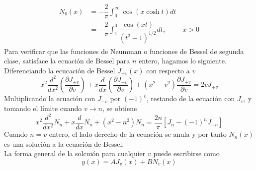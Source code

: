 \begin{eqnarray}
\begin{aligned}
N_{0}(x) &= - \dfrac{2}{\pi} \int_{0}^{\infty} \cos (x \cosh t ) dt \\
&= - \dfrac{2}{\pi} \int_{1}^{0} \dfrac{\cos (xt)}{(t^{2}-1)^{1/2}} dt, \hspace{1cm}  x>0
\end{aligned}
\label{eq:ecuacion_11_65a}
\end{eqnarray}
Para verificar que las funciones de Neumman o funciones de Bessel de segunda clase, satisface la ecuación de Bessel para $n$ entero, hagamos lo siguiente. Diferenciando la ecucación de Bessel $J_{\pm v}(x)$ con respecto a $v$
\begin{equation}
x^{2} \dfrac{d^{2}}{dx^{2}} \left( \dfrac{\partial J_{\pm v}}{\partial v} \right) + x \dfrac{d}{dx} \left( \dfrac{\partial J_{\pm v}}{\partial v} \right) + (x^{2} - v^{2}) \dfrac{\partial J_{\pm v}}{\partial v} = 2 v J_{\pm v}
\label{eq:ecuacion_11_66}
\end{equation}
Multiplicando la ecuación con $J_{-v}$ por $(-1)^{v}$, restando de la ecuación con $J_{v}$, y tomando el límite cuando $v \to n$, se obtiene
\begin{equation}
x^{2} \dfrac{d^{2}}{dx^{2}} N_{n} +  x \dfrac{d}{dx} N_{n} + (x^{2} - n^{2}) N_{n} = \dfrac{2n}{\pi}[ J_{n} - (-1)^{n} J_{-n}]
\label{eq:ecuacion_11_67}
\end{equation}
Cuando $n=v$ entero, el lado derecho de la ecuación se anula y por tanto $N_{n}(x)$ es una solución a la ecuación de Bessel.
\\
La forma general de la solcuión para cualquier $v$ puede escribirse como
\begin{equation}
y(x) = A J_{v}(x) + B N_{v}(x)
\end{equation}
